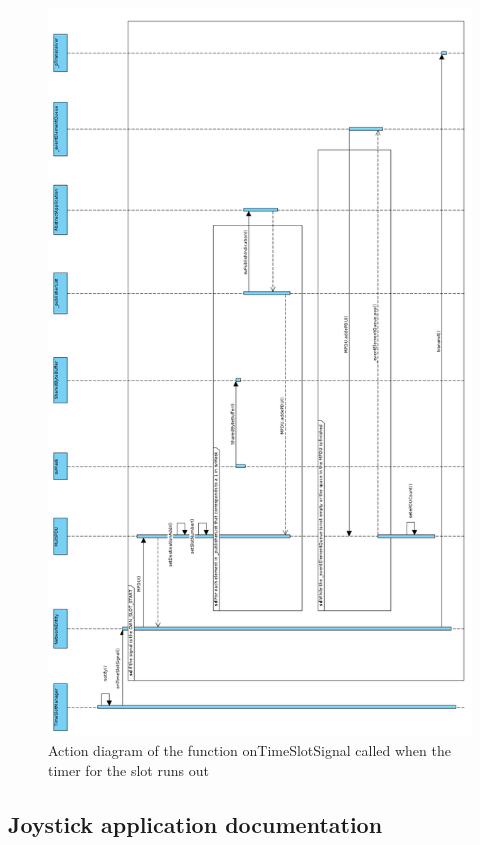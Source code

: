\begin{figure}[H]
	\centering
	\includegraphics[height=\textheight]{images/onTimeSlotSignal_rotated.png}
	\caption{Action diagram of the function onTimeSlotSignal called when the timer for the slot runs out}
	\label{fig:onTimeSlotSignal}
\end{figure}

\subsection{Joystick application documentation}

